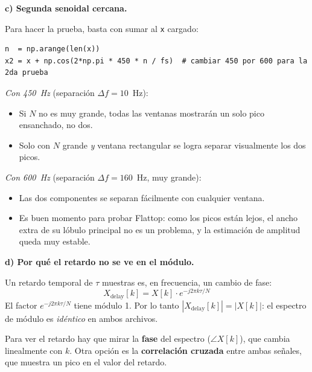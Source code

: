 \documentclass[11pt, a4paper]{article}
\begin{document}
\textbf{c) Segunda senoidal cercana.}

Para hacer la prueba, basta con sumar al \texttt{x} cargado:
\begin{lstlisting}[style=pystyle]
n  = np.arange(len(x))
x2 = x + np.cos(2*np.pi * 450 * n / fs)  # cambiar 450 por 600 para la 2da prueba
\end{lstlisting}

\emph{Con 450~Hz} (separaci\'on $\Delta f = 10$~Hz):
\begin{itemize}[noitemsep]
  \item Si $N$ no es muy grande, todas las ventanas mostrar\'an un solo pico
    ensanchado, no dos.
  \item Solo con $N$ grande \emph{y} ventana rectangular se logra separar
    visualmente los dos picos.
\end{itemize}

\emph{Con 600~Hz} (separaci\'on $\Delta f = 160$~Hz, muy grande):
\begin{itemize}[noitemsep]
  \item Las dos componentes se separan f\'acilmente con cualquier ventana.
  \item Es buen momento para probar Flattop: como los picos est\'an lejos,
    el ancho extra de su l\'obulo principal no es un problema, y la
    estimaci\'on de amplitud queda muy estable.
\end{itemize}

\textbf{d) Por qu\'e el retardo no se ve en el m\'odulo.}

Un retardo temporal de $\tau$ muestras es, en frecuencia, un cambio de fase:
\[
  X_{\text{delay}}[k] = X[k] \cdot e^{-j 2\pi k \tau / N}
\]
El factor $e^{-j2\pi k\tau/N}$ tiene m\'odulo 1.
Por lo tanto $|X_{\text{delay}}[k]| = |X[k]|$: el espectro de m\'odulo es
\emph{id\'entico} en ambos archivos.

Para ver el retardo hay que mirar la \textbf{fase} del espectro
($\angle X[k]$), que cambia linealmente con $k$.
Otra opci\'on es la \textbf{correlaci\'on cruzada} entre ambas se\~nales,
que muestra un pico en el valor del retardo.
\end{document}
